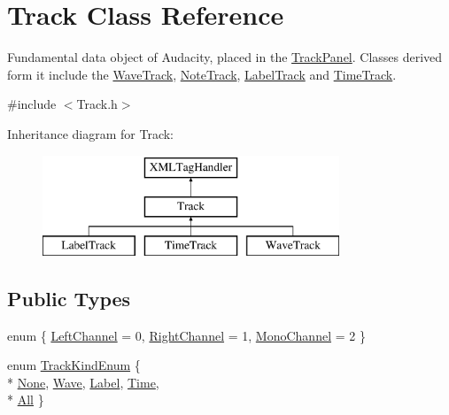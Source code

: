 \hypertarget{class_track}{}\section{Track Class Reference}
\label{class_track}


Fundamental data object of Audacity, placed in the \hyperlink{class_track_panel}{Track\+Panel}. Classes derived form it include the \hyperlink{class_wave_track}{Wave\+Track}, \hyperlink{class_note_track}{Note\+Track}, \hyperlink{class_label_track}{Label\+Track} and \hyperlink{class_time_track}{Time\+Track}.  




{\ttfamily \#include $<$Track.\+h$>$}

Inheritance diagram for Track\+:\begin{figure}[H]
\begin{center}
\leavevmode
\includegraphics[height=3.000000cm]{class_track}
\end{center}
\end{figure}
\subsection*{Public Types}
\begin{DoxyCompactItemize}
\item 
enum \{ \hyperlink{class_track_af7ac66dc1b976cffbaee1e01206d362fa4cc8a2bb7bc243eab53ba2abd757d9da}{Left\+Channel} = 0, 
\hyperlink{class_track_af7ac66dc1b976cffbaee1e01206d362faa9c6ea023df4504361ffa1a31238c87e}{Right\+Channel} = 1, 
\hyperlink{class_track_af7ac66dc1b976cffbaee1e01206d362fad1d594e80888976c85f7a4a258dc2f19}{Mono\+Channel} = 2
 \}
\item 
enum \hyperlink{class_track_a4a6604845139575dfc25be299aeb60ef}{Track\+Kind\+Enum} \{ \\*
\hyperlink{class_track_a4a6604845139575dfc25be299aeb60efa3ebf538e767ee3e455126fb4ea4a4e0b}{None}, 
\hyperlink{class_track_a4a6604845139575dfc25be299aeb60efab39033be088537a007532668cb6d16a8}{Wave}, 
\hyperlink{class_track_a4a6604845139575dfc25be299aeb60efaaa103f3467e47ffcb1aa408d53f7bf6e}{Label}, 
\hyperlink{class_track_a4a6604845139575dfc25be299aeb60efa2348e03ba06177fe4dbcf87e27d82e33}{Time}, 
\\*
\hyperlink{class_track_a4a6604845139575dfc25be299aeb60efaa2633d5555a8b46b60c277da23d207f4}{All}
 \}
\end{DoxyCompactItemize}
